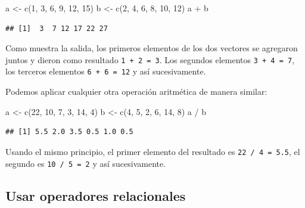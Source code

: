 \documentclass[
]{book}
\newenvironment{Shaded}{\begin{snugshade}}{\end{snugshade}}
\newcommand{\DecValTok}[1]{\textcolor[rgb]{0.00,0.00,0.81}{#1}}
\newcommand{\FunctionTok}[1]{\textcolor[rgb]{0.00,0.00,0.00}{#1}}
\newcommand{\NormalTok}[1]{#1}
\newcommand{\OtherTok}[1]{\textcolor[rgb]{0.56,0.35,0.01}{#1}}
\newcommand{\SpecialCharTok}[1]{\textcolor[rgb]{0.00,0.00,0.00}{#1}}
\begin{document}
\begin{Shaded}
\begin{Highlighting}[]
\NormalTok{a }\OtherTok{\textless{}{-}} \FunctionTok{c}\NormalTok{(}\DecValTok{1}\NormalTok{, }\DecValTok{3}\NormalTok{, }\DecValTok{6}\NormalTok{, }\DecValTok{9}\NormalTok{, }\DecValTok{12}\NormalTok{, }\DecValTok{15}\NormalTok{)}
\NormalTok{b }\OtherTok{\textless{}{-}} \FunctionTok{c}\NormalTok{(}\DecValTok{2}\NormalTok{, }\DecValTok{4}\NormalTok{, }\DecValTok{6}\NormalTok{, }\DecValTok{8}\NormalTok{, }\DecValTok{10}\NormalTok{, }\DecValTok{12}\NormalTok{)}
\NormalTok{a }\SpecialCharTok{+}\NormalTok{ b}
\end{Highlighting}
\end{Shaded}

\begin{verbatim}
## [1]  3  7 12 17 22 27
\end{verbatim}

Como muestra la salida, los primeros elementos de los dos vectores se agregaron juntos y dieron como resultado \texttt{1\ +\ 2\ =\ 3}. Los segundos elementos \texttt{3\ +\ 4\ =\ 7}, los terceros elementos \texttt{6\ +\ 6\ =\ 12} y así sucesivamente.

Podemos aplicar cualquier otra operación aritmética de manera similar:

\begin{Shaded}
\begin{Highlighting}[]
\NormalTok{a }\OtherTok{\textless{}{-}} \FunctionTok{c}\NormalTok{(}\DecValTok{22}\NormalTok{, }\DecValTok{10}\NormalTok{, }\DecValTok{7}\NormalTok{, }\DecValTok{3}\NormalTok{, }\DecValTok{14}\NormalTok{, }\DecValTok{4}\NormalTok{)}
\NormalTok{b }\OtherTok{\textless{}{-}} \FunctionTok{c}\NormalTok{(}\DecValTok{4}\NormalTok{, }\DecValTok{5}\NormalTok{, }\DecValTok{2}\NormalTok{, }\DecValTok{6}\NormalTok{, }\DecValTok{14}\NormalTok{, }\DecValTok{8}\NormalTok{)}
\NormalTok{a }\SpecialCharTok{/}\NormalTok{ b}
\end{Highlighting}
\end{Shaded}

\begin{verbatim}
## [1] 5.5 2.0 3.5 0.5 1.0 0.5
\end{verbatim}

Usando el mismo principio, el primer elemento del resultado es \texttt{22\ /\ 4\ =\ 5.5}, el segundo es \texttt{10\ /\ 5\ =\ 2} y así sucesivamente.

\hypertarget{usar-operadores-relacionales}{%
\subsection{Usar operadores relacionales}\label{usar-operadores-relacionales}}
\end{document}
